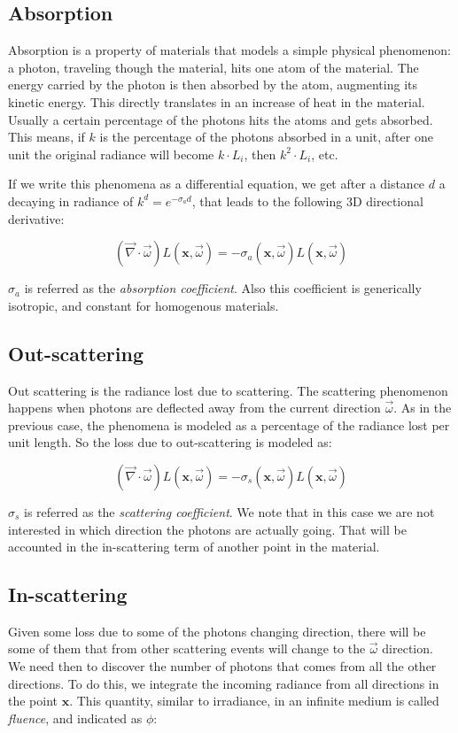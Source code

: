 \subsection{Absorption}
Absorption is a property of materials that models a simple physical phenomenon: a photon, traveling though the material, hits one atom of the material. The energy carried by the photon is then absorbed by the atom, augmenting its kinetic energy. This directly translates in an increase of heat in the material. Usually a certain percentage of the photons hits the atoms and gets absorbed. This means, if $k$ is the percentage of the photons absorbed in a unit, after one unit the original radiance will become $k \cdot L_i$, then $k^2 \cdot L_i$, etc.

If we write this phenomena as a differential equation, we get after a distance $d$ a decaying in radiance of $k^d = e^{-\sigma_a d}$, that leads to the following 3D directional derivative:

$$
(\vec{\nabla} \cdot \vec{\omega}) L(\mathbf{x}, \vec{\omega}) = -\sigma_a(\mathbf{x},\vec{\omega}) L(\mathbf{x}, \vec{\omega})
$$

$\sigma_a$ is referred as the \emph{absorption coefficient}. Also this coefficient is generically isotropic, and constant for homogenous materials.

\subsection{Out-scattering}
Out scattering is the radiance lost due to scattering. The scattering phenomenon happens when photons are deflected away from the current direction $\vec{\omega}$.  As in the previous case, the phenomena is modeled as a percentage of the radiance lost per unit length. So the loss due to out-scattering is modeled as:

$$
(\vec{\nabla} \cdot \vec{\omega}) L(\mathbf{x}, \vec{\omega}) = -\sigma_s(\mathbf{x},\vec{\omega}) L(\mathbf{x}, \vec{\omega})
$$

$\sigma_s$ is referred as the \emph{scattering coefficient}. We note that in this case we are not interested in which direction the photons are actually going. That will be accounted in the in-scattering term of another point in the material.

\subsection{In-scattering}
Given some loss due to some of the photons changing direction, there will be some of them that from other scattering events will change to the $\vec{\omega}$ direction. We need then to discover the number of photons that comes from all the other directions. To do this, we integrate the incoming radiance from all directions in the point $\mathbf{x}$. This quantity, similar to irradiance, in an infinite medium is called \emph{fluence}, and indicated as $\phi$:

